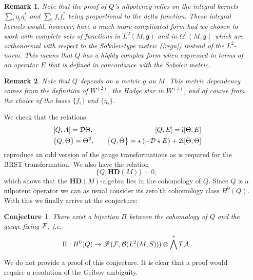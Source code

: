 \documentclass[letterpaper,12pt]{article}
\newcommand{\nn}{\nonumber}
\def\OO{\Omega}
\def\P{\Pi}
\def\ca{{\cal A}}
\def\cb{{\cal B}}
\def\cd{{\cal D}}
\def\cf{{\cal F}}
\newtheorem{conj}[thm]{Conjecture}
\newtheorem{remark}{Remark}
\begin{document}
\begin{remark}
Note that the proof of $Q$'s nilpotency relies on the integral kernels $\sum_i {\eta}_i {\eta}_i^* $ and $\sum_i f_i f_i^*$ being proportional to the delta function. These integral kernels would, however, have a much more complicated form had we chosen to work with complete sets of functions in $L^2(M,\mathfrak{g})$ and in $\OO^1(M,\mathfrak{g})$ which are orthonormal with respect to the Sobolev-type metric (\ref{regn}) instead of the $L^2$-norm. This means that $Q$ has a highly complex form when expressed in terms of an operator 
${E}$ that is defined in concordance with the Sobolev metric. 
\end{remark}
\begin{remark}
Note that $Q$ depends on a metric $g$ on $M$. This metric dependency comes from the definition of $W^{(2)}$, the Hodge star in $W^{(1)}$, and of course from the choice of the bases $\{f_i\}$ and $\{ \eta_i \}$. 
\end{remark}
We check that the relations
\begin{eqnarray}
&\left[Q  , A  \right]  =  \cd\Theta ,&\quad
\left[Q  , {E}  \right]  = \mathrm{i}[\Theta, {E}]
\nn\\
&\left\{Q  , \Theta  \right\}  = \Theta^2  ,&\quad
\left\{Q  , \bar{\Theta}  \right\}  =\star\left( - \cd\star {E}\right) %
+ 2\mathrm{i}[\bar{\Theta},\Theta]
\nn
\end{eqnarray}
reproduce an odd version of the gauge transformations as is required for the BRST transformation.
We also have the relation 
$$
 \{Q, \mathbf{HD}(M) \}=0,  
$$
which shows that the $\mathbf{HD}(M)$-algebra  lies in the cohomology of $Q$.
Since $Q$ is a nilpotent operator we can as usual consider its zero'th cohomology class $H^0(Q)$. With this we finally arrive at the conjecture:
\begin{conj}
There exist a bijection $\P$ between the  cohomology of $Q$ and the gauge fixing $\cf$, i.e.
$$
\P: H^0(Q)\rightarrow \mathscr{F}(\cf, \cb (L^2(M,S ))) \otimes\bigwedge^* T\ca  .
$$
\end{conj}
We do not provide a proof of this conjecture. It is clear that a proof would require a resolution of the Gribov ambiguity.
\end{document}
